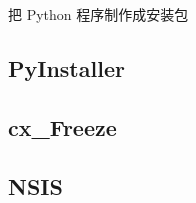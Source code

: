 
\begin{issues}
\issueDraft
\end{issues}

把 Python 程序制作成安装包

\subsection{PyInstaller}

\subsection{cx_Freeze}

\subsection{NSIS}

